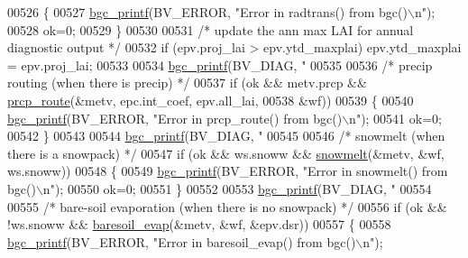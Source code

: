 \begin{DoxyCode}
{{{{{{{{{{00526             \{
00527                 \hyperlink{bgc__io_8c_af287cce6e2aede1ce337de9319e80d0d}{bgc\_printf}(BV\_ERROR, \textcolor{stringliteral}{"Error in radtrans() from bgc()\(\backslash\)n"});
00528                 ok=0;
00529             \}
00530             
00531             \textcolor{comment}{/* update the ann max LAI for annual diagnostic output */}
00532             \textcolor{keywordflow}{if} (epv.proj\_lai > epv.ytd\_maxplai) epv.ytd\_maxplai = epv.proj\_lai;
00533             
00534             \hyperlink{bgc__io_8c_af287cce6e2aede1ce337de9319e80d0d}{bgc\_printf}(BV\_DIAG, \textcolor{stringliteral}{"%
00535             
00536             \textcolor{comment}{/* precip routing (when there is precip) */}
00537             \textcolor{keywordflow}{if} (ok && metv.prcp && \hyperlink{prcp__route_8c_a5215fb55bf012e8cc6bb76df6ef10f08}{prcp\_route}(&metv, epc.int\_coef, epv.all\_lai,
00538                 &wf))
00539             \{
00540                 \hyperlink{bgc__io_8c_af287cce6e2aede1ce337de9319e80d0d}{bgc\_printf}(BV\_ERROR, \textcolor{stringliteral}{"Error in prcp\_route() from bgc()\(\backslash\)n"});
00541                 ok=0;
00542             \}
00543             
00544             \hyperlink{bgc__io_8c_af287cce6e2aede1ce337de9319e80d0d}{bgc\_printf}(BV\_DIAG, \textcolor{stringliteral}{"%
00545 
00546             \textcolor{comment}{/* snowmelt (when there is a snowpack) */}
00547             \textcolor{keywordflow}{if} (ok && ws.snoww && \hyperlink{snowmelt_8c_a15e5894893f03411741f82c914d50516}{snowmelt}(&metv, &wf, ws.snoww))
00548             \{
00549                 \hyperlink{bgc__io_8c_af287cce6e2aede1ce337de9319e80d0d}{bgc\_printf}(BV\_ERROR, \textcolor{stringliteral}{"Error in snowmelt() from bgc()\(\backslash\)n"});
00550                 ok=0;
00551             \}
00552             
00553             \hyperlink{bgc__io_8c_af287cce6e2aede1ce337de9319e80d0d}{bgc\_printf}(BV\_DIAG, \textcolor{stringliteral}{"%
00554 
00555             \textcolor{comment}{/* bare-soil evaporation (when there is no snowpack) */}
00556             \textcolor{keywordflow}{if} (ok && !ws.snoww && \hyperlink{baresoil__evap_8c_a9fcd7d8f180b7c75bebbd7f3c544218e}{baresoil\_evap}(&metv, &wf, &epv.dsr))
00557             \{
00558                 \hyperlink{bgc__io_8c_af287cce6e2aede1ce337de9319e80d0d}{bgc\_printf}(BV\_ERROR, \textcolor{stringliteral}{"Error in baresoil\_evap() from bgc()\(\backslash\)n"});
}}}}}}}}}}}}}
\end{DoxyCode}
